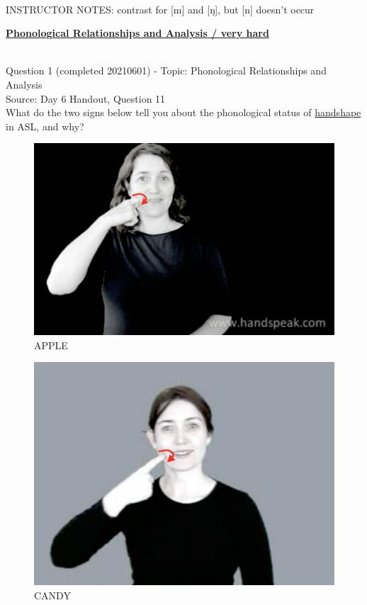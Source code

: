 \documentclass[12pt]{article}
\begin{document}
~\\
INSTRUCTOR NOTES: contrast for [m] and [ŋ], but [n] doesn't occur


\newpage\textbf{\underline{\huge Phonological Relationships and Analysis / very hard\\}}

~\\

{\large Question 1} (completed 20210601) - Topic: Phonological Relationships and Analysis\\
Source: Day 6 Handout, Question 11\\

What do the two signs below tell you about the phonological status of \underline{handshape} in ASL, and why?\\

\begin{figure}[H]
\includegraphics{../images/asl_apple.png}
\caption{APPLE}
\end{figure}
\begin{figure}[H]
\includegraphics{../images/asl_candy.png}
\caption{CANDY}
\end{figure}
\end{document}

